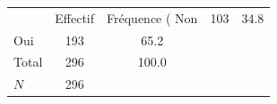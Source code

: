 {
\def\sym#1{\ifmmode^{#1}\else\(^{#1}\)\fi}
\begin{tabular}{l*{1}{cc}}
\toprule
            &    Effectif&Fréquence (%
\midrule
Non         &         103&        34.8\\
Oui         &         193&        65.2\\
Total       &         296&       100.0\\
\midrule
\(N\)       &         296&            \\
\bottomrule
\end{tabular}
}
